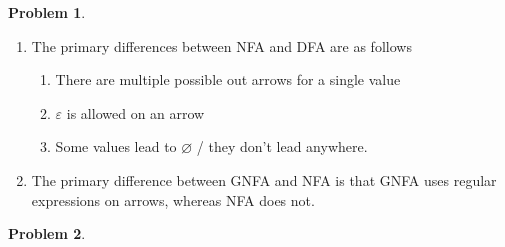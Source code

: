 \documentclass[11pt]{article}
\theoremstyle{definition}
\theoremstyle{case}
\theoremstyle{theorem}
\newtheorem{prob}{Problem}
\begin{document}
\begin{prob}\end{prob}

\begin{enumerate}[label=(\alph*)]

\item
The primary differences between NFA and DFA are as follows
\begin{enumerate}[label=\arabic*.]
\item There are multiple possible out arrows for a single value
\item $\varepsilon$ is allowed on an arrow
\item Some values lead to $\varnothing$ / they don't lead anywhere.
\end{enumerate}

\item
The primary difference between GNFA and NFA is that GNFA uses regular expressions on arrows, 
whereas NFA does not.

\end{enumerate}

\newpage

\begin{prob}\end{prob}
\end{document}
